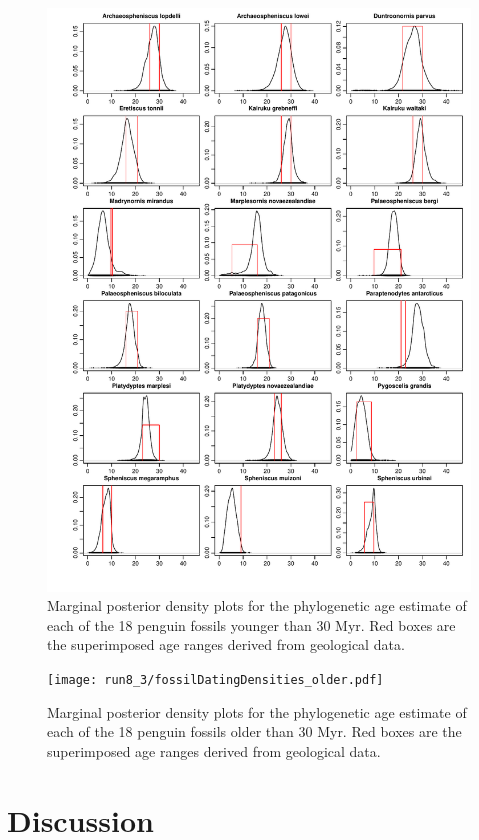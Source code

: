 \documentclass[11pt]{article}
\begin{document}
\begin{figure}
\includegraphics[width=6in]{run8_5/fossilDatingDensities_younger.pdf}
\caption{Marginal posterior density plots for the phylogenetic age estimate of each of the 18 penguin fossils younger than 30 Myr. Red boxes are the superimposed age ranges derived from geological data.}
\end{figure}

\begin{figure}
\texttt{[image: run8\_3/fossilDatingDensities\_older.pdf]}
\caption{Marginal posterior density plots for the phylogenetic age estimate of each of the 18 penguin fossils older than 30 Myr. Red boxes are the superimposed age ranges derived from geological data.}
\end{figure}



\section*{Discussion}
\end{document}

